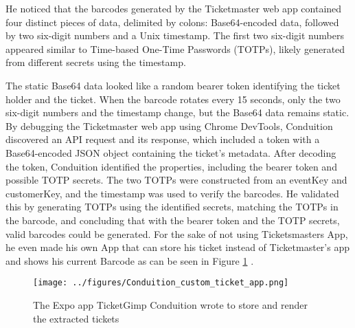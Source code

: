 He noticed that the barcodes generated by the Ticketmaster web app contained four distinct pieces of data, 
delimited by colons: Base64-encoded data, followed by two six-digit numbers and a Unix timestamp. 
The first two six-digit numbers appeared similar to Time-based One-Time Passwords (TOTPs), 
likely generated from different secrets using the timestamp.

The static Base64 data looked like a random bearer token identifying the ticket holder and the ticket. 
When the barcode rotates every 15 seconds, only the two six-digit numbers and the timestamp change, but the Base64 data remains static. 
By debugging the Ticketmaster web app using Chrome DevTools, Conduition discovered an API request and its response, 
which included a token with a Base64-encoded JSON object containing the ticket's metadata. 
After decoding the token, Conduition identified the properties, including the bearer token and possible TOTP secrets.
The two TOTPs were constructed from an eventKey and customerKey, and the timestamp was used to verify the barcodes. 
He validated this by generating TOTPs using the identified secrets, matching the TOTPs in the barcode, 
and concluding that with the bearer token and the TOTP secrets, valid barcodes could be generated.
For the sake of not using Ticketsmasters App, he even made his own App that can store his ticket instead of Ticketmaster's app and shows his current Barcode as can be seen in Figure \ref{fig:conduition_custom_app} \cite{reverse_engineering_ticketmaster}.

\begin{figure}[H]
    \begin{center}
    \texttt{[image: ../figures/Conduition\_custom\_ticket\_app.png]}
    \caption{The Expo app TicketGimp Conduition wrote to store and render the extracted tickets \cite{reverse_engineering_ticketmaster}}
    \label{fig:conduition_custom_app}
    \end{center}
\end{figure}
